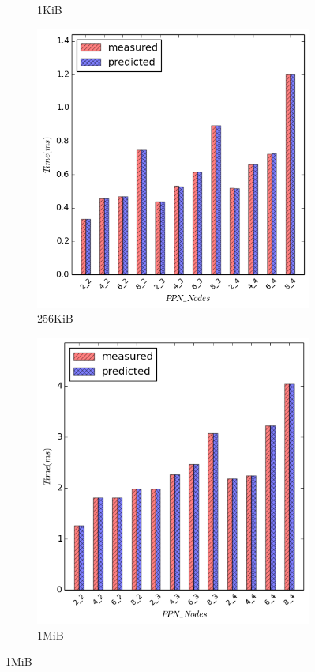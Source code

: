 \begin{figure}[H]
\begin{subfigure}[b]{0.4\textwidth}
        \caption{1KiB}
    \end{subfigure}
    \quad
        \begin{subfigure}[b]{0.4\textwidth}
        \includegraphics[width=\textwidth]{./images/broadcast_NUMA/bcast_262144.png}
        \caption{256KiB}
    \end{subfigure}
    \quad
        \begin{subfigure}[b]{0.4\textwidth}
        \includegraphics[width=\textwidth]{./images/broadcast_NUMA/bcast_1048576.png}
        \caption{1MiB}
    \end{subfigure}


\end{figure}
